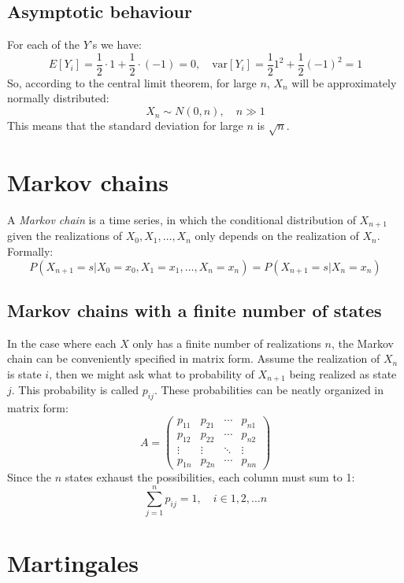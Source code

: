 \documentclass[12pt, a4paper]{article}
\numberwithin{equation}{section}
\begin{document}
\subsection{Asymptotic behaviour}
For each of the $Y$'s we have:
\begin{equation}
E[Y_i]=\frac{1}{2}\cdot 1+\frac{1}{2}\cdot(-1)=0,\quad\textrm{var}[Y_i]=\frac{1}{2}1^2+\frac{1}{2}(-1)^2=1
\end{equation}
So, according to the central limit theorem, for large $n$, $X_n$ will be approximately normally distributed:
\begin{equation}
X_n\sim N(0,n),\quad n\gg 1
\end{equation}
This means that the standard deviation for large $n$ is $\sqrt{n}$.

\section{Markov chains}
A \textit{Markov chain} is a time series, in which the conditional distribution of $X_{n+1}$ given the realizations of $X_0, X_1,\ldots, X_n$ only depends on the realization of $X_n$. Formally:
\begin{equation}
P(X_{n+1}=s|X_0=x_0, X_1=x_1,\ldots, X_n=x_n)=P(X_{n+1}=s|X_n=x_n)
\end{equation}

\subsection{Markov chains with a finite number of states}
In the case where each $X$ only has a finite number of realizations $n$, the Markov chain can be conveniently specified in matrix form. Assume the realization of $X_n$ is state $i$, then we might ask what to probability of $X_{n+1}$ being realized as state $j$. This probability is called $p_{ij}$. These probabilities can be neatly organized in matrix form:
\begin{equation}
A=\begin{pmatrix}
p_{11}	& p_{21}	& \cdots	& p_{n1} \\
p_{12}	& p_{22}	& \cdots	& p_{n2} \\
\vdots	& \vdots	& \ddots	& \vdots \\
p_{1n}	& p_{2n}	& \cdots	& p_{nn}
\end{pmatrix}
\end{equation}
Since the $n$ states exhaust the possibilities, each column must sum to 1:
\begin{equation}
\sum_{j=1}^n p_{ij}=1,\quad i\in{1,2,\ldots n}
\end{equation}

\section{Martingales}
\end{document}
